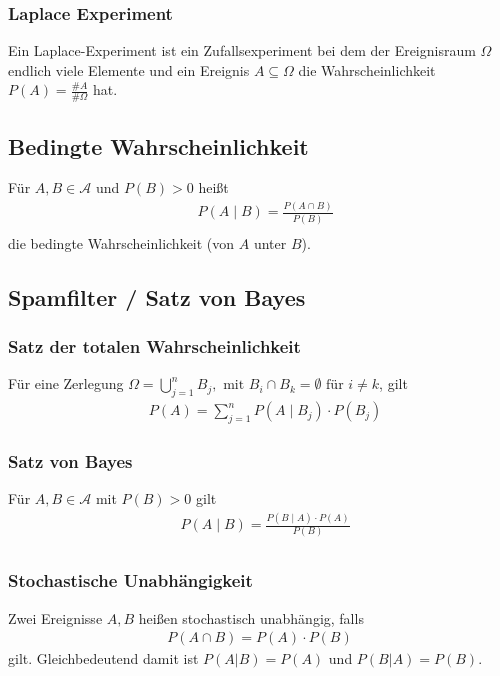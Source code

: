 \documentclass[a4paper]{article}
\begin{document}
\subsubsection{Laplace Experiment}
Ein Laplace-Experiment ist ein Zufallsexperiment bei dem der Ereignisraum $\Omega$ endlich viele Elemente und ein Ereignis $A \subseteq \Omega$ die Wahrscheinlichkeit $P(A) = \frac{\#A}{\#\Omega}$ hat.


\subsection{Bedingte Wahrscheinlichkeit}
Für $A,B \in \mathcal{A}$ und $P(B) > 0$ heißt
\begin{align*}
& P(A \; | \;  B) = \frac{P(A \cap B)}{P(B)} \\
\end{align*}
die bedingte Wahrscheinlichkeit (von $A$ unter $B$).


\subsection{Spamfilter / Satz von Bayes}

\subsubsection{Satz der totalen Wahrscheinlichkeit}
Für eine Zerlegung  $\Omega = \bigcup_{j=1}^{n} B_j, \text{ mit } B_i \cap B_k = \emptyset \text{ für } i \neq k $, gilt
\begin{align*}
& P(A ) = \sum_{j=1}^{n}  P(A \; | \;  B_j) \cdot P(B_j)
\end{align*}

\subsubsection{Satz von Bayes}
Für $A,B \in \mathcal{A}$ mit  $P(B) > 0$ gilt
\begin{align*}
& P(A \; | \;  B) = \frac{P(B \; | \; A) \cdot P(A)} {P(B)} \\
\end{align*}

\subsubsection{Stochastische Unabhängigkeit}
Zwei Ereignisse $A,B$ heißen stochastisch unabhängig, falls
\begin{align*}
P(A \cap B) = P(A) \cdot P(B)
\end{align*}
gilt.  Gleichbedeutend damit ist  $P(A | B) = P(A)$ und $P(B  | A) = P(B)$.
\end{document}
